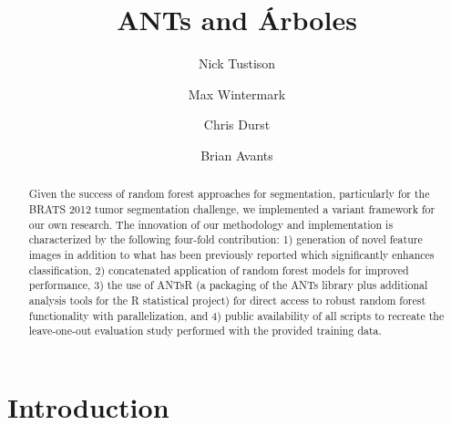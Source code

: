 \documentclass{llncs}
\begin{document}
%
\frontmatter          %
%

\mainmatter              %
%
\title{ANTs and \'{A}rboles}
%
\titlerunning{}  %
%
\author{Nick Tustison \and Max Wintermark \and Chris Durst \and Brian Avants}


\maketitle              %

\begin{abstract}
Given the success of random forest approaches for segmentation, particularly for 
the BRATS 2012 tumor segmentation challenge, we implemented
a variant framework for our own research. 
The innovation of our methodology and implementation is characterized by 
the following four-fold contribution:
1) generation of
novel feature images in addition to what has been previously 
reported which significantly enhances classification,  2) 
concatenated application of random forest models for improved performance, 
3) the use of ANTsR (a packaging of the ANTs library plus 
additional analysis tools for
the R statistical project) for direct access to robust 
random forest functionality with parallelization, and 4) 
public availability of all scripts to recreate the 
leave-one-out evaluation study performed with the provided 
training data.
\end{abstract}

\section{Introduction}

\end{document}
